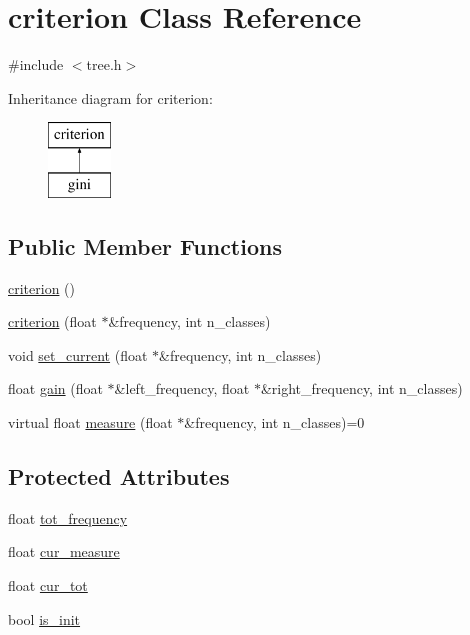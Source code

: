 \hypertarget{classcriterion}{\section{criterion Class Reference}
\label{classcriterion}
}


{\ttfamily \#include $<$tree.\+h$>$}

Inheritance diagram for criterion\+:\begin{figure}[H]
\begin{center}
\leavevmode
\includegraphics[height=2.000000cm]{classcriterion}
\end{center}
\end{figure}
\subsection*{Public Member Functions}
\begin{DoxyCompactItemize}
\item 
\hyperlink{classcriterion_a5047629e45833624bc6955cc0dd106b8}{criterion} ()
\item 
\hyperlink{classcriterion_acf80c0b2acf9fb6f2b8369868cafdbff}{criterion} (float $\ast$\&frequency, int n\+\_\+classes)
\item 
void \hyperlink{classcriterion_a043c2105b2cfc256cb530c55b65156f2}{set\+\_\+current} (float $\ast$\&frequency, int n\+\_\+classes)
\item 
float \hyperlink{classcriterion_a8d42878c94bae5a72475b568bcbbddfa}{gain} (float $\ast$\&left\+\_\+frequency, float $\ast$\&right\+\_\+frequency, int n\+\_\+classes)
\item 
virtual float \hyperlink{classcriterion_a1fbda0723578acd5ac612248a54ba71d}{measure} (float $\ast$\&frequency, int n\+\_\+classes)=0
\end{DoxyCompactItemize}
\subsection*{Protected Attributes}
\begin{DoxyCompactItemize}
\item 
float \hyperlink{classcriterion_ac226599a3e6e160614d3698193053368}{tot\+\_\+frequency}
\item 
float \hyperlink{classcriterion_af8e6efc16000b83cffb9e0864bf68561}{cur\+\_\+measure}
\item 
float \hyperlink{classcriterion_aa89bec3e37cd874b3590887038712c54}{cur\+\_\+tot}
\item 
bool \hyperlink{classcriterion_a5f3c4708d9e6a9120ec8b8d98c73ff47}{is\+\_\+init}
\end{DoxyCompactItemize}



